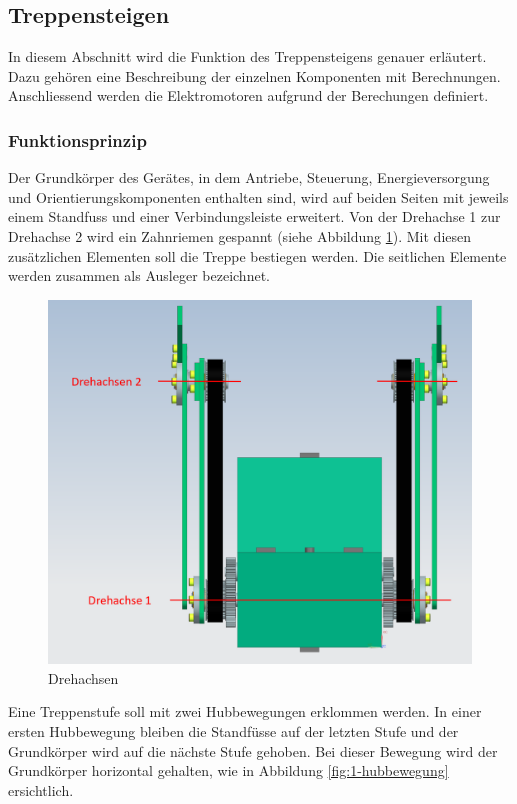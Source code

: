 \subsection{Treppensteigen}
In diesem Abschnitt wird die Funktion des Treppensteigens genauer erläutert. Dazu gehören eine Beschreibung der einzelnen Komponenten mit Berechnungen. Anschliessend werden die Elektromotoren aufgrund der Berechungen definiert. 
\subsubsection{Funktionsprinzip}
Der Grundkörper des Gerätes, in dem Antriebe, Steuerung, Energieversorgung und Orientierungskomponenten enthalten sind, wird auf beiden Seiten mit jeweils einem Standfuss und einer Verbindungsleiste erweitert. Von der Drehachse 1 zur Drehachse 2 wird ein Zahnriemen gespannt (siehe Abbildung \ref{fig:skizze-drehachse-final}). Mit diesen zusätzlichen Elementen soll die Treppe bestiegen werden. Die seitlichen Elemente werden zusammen als Ausleger bezeichnet.

\begin{figure}[H]
  \includegraphics[width=1\textwidth]{img/Treppensteigen/Skizze Drehachsen final.PNG}
  \centering
  \caption{Drehachsen}
  \label{fig:skizze-drehachse-final}
\end{figure}

\newpage

Eine Treppenstufe soll mit zwei Hubbewegungen erklommen werden. In einer ersten Hubbewegung bleiben die Standfüsse auf der letzten Stufe und der Grundkörper wird auf die nächste Stufe gehoben. Bei dieser Bewegung wird der Grundkörper horizontal gehalten, wie in Abbildung \ref{fig:1-hubbewegung} ersichtlich.

